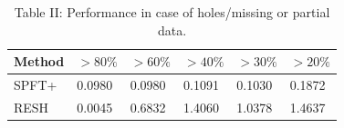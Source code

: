 \documentclass{UCF_ETD}
\begin{document}
\begin{table}
\begin{center}

    \caption{Table II: Performance in case of holes/missing or partial data. }
    \begin{tabular}{| l | l | l | l | l | l |}
    \hline
    Method & $>80\%$ & $>60\%$ & $>40\%$ & $>30\%$ & $>20\%$ \\ \hline
    SPFT+ & 0.0980 &  0.0980 &  0.1091 &  0.1030 &  0.1872 \\ \hline
    RESH & 0.0045 & 0.6832 & 1.4060 &  1.0378 & 1.4637 \\ \hline
    \end{tabular}

\end{center}    
\end{table}
\end{document}
